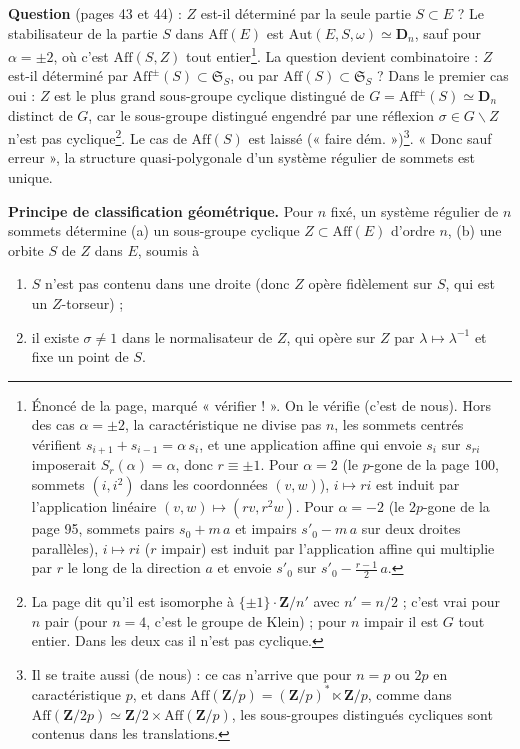 \documentclass[11pt,a4paper]{article}
\begin{document}
\textbf{Question} (pages 43 et 44) : $Z$ est-il déterminé par la seule partie
$S \subset E$ ? Le stabilisateur de la partie $S$ dans $\mathrm{Aff}(E)$ est
$\mathrm{Aut}(E, S, \omega) \simeq \mathbf{D}_n$, sauf pour $\alpha = \pm 2$,
où c'est $\mathrm{Aff}(S, Z)$ tout entier\footnote{Énoncé de la page,
marqué « vérifier ! ». On le vérifie (c'est de nous). Hors des cas $\alpha =
\pm 2$, la caractéristique ne divise pas $n$, les sommets centrés vérifient
$s_{i+1} + s_{i-1} = \alpha\, s_i$, et une application affine qui envoie
$s_i$ sur $s_{ri}$ imposerait $S_r(\alpha) = \alpha$, donc $r \equiv \pm 1$.
Pour $\alpha = 2$ (le $p$-gone de la page 100, sommets $(i, i^2)$ dans les
coordonnées $(v, w)$), $i \mapsto ri$ est induit par l'application linéaire
$(v, w) \mapsto (rv, r^2 w)$. Pour $\alpha = -2$ (le $2p$-gone de la
page 95, sommets pairs $s_0 + m\,a$ et impairs $s'_0 - m\,a$ sur deux droites
parallèles), $i \mapsto ri$ ($r$ impair) est induit par l'application affine
qui multiplie par $r$ le long de la direction $a$ et envoie $s'_0$ sur $s'_0 -
\frac{r-1}{2}\,a$.}. La question devient combinatoire : $Z$ est-il déterminé
par $\mathrm{Aff}^{\pm}(S) \subset \mathfrak{S}_S$, ou par $\mathrm{Aff}(S)
\subset \mathfrak{S}_S$ ? Dans le premier cas oui : $Z$ est le plus grand
sous-groupe cyclique distingué de $G = \mathrm{Aff}^{\pm}(S) \simeq
\mathbf{D}_n$ distinct de $G$, car le sous-groupe distingué engendré par une
réflexion $\sigma \in G \smallsetminus Z$ n'est pas cyclique\footnote{La page
dit qu'il est isomorphe à $\{\pm 1\} \cdot \mathbf{Z}/n'$ avec $n' = n/2$ ;
c'est vrai pour $n$ pair (pour $n = 4$, c'est le groupe de Klein) ; pour $n$
impair il est $G$ tout entier. Dans les deux cas il n'est pas cyclique.}. Le
cas de $\mathrm{Aff}(S)$ est laissé (« faire dém. »)\footnote{Il se traite
aussi (de nous) : ce cas n'arrive que pour $n = p$ ou $2p$ en caractéristique
$p$, et dans $\mathrm{Aff}(\mathbf{Z}/p) = (\mathbf{Z}/p)^{*} \ltimes
\mathbf{Z}/p$, comme dans $\mathrm{Aff}(\mathbf{Z}/2p) \simeq \mathbf{Z}/2
\times \mathrm{Aff}(\mathbf{Z}/p)$, les sous-groupes distingués cycliques sont
contenus dans les translations.}. « Donc sauf erreur », la structure
quasi-polygonale d'un système régulier de sommets est unique.

\textbf{Principe de classification géométrique.} Pour $n$ fixé, un système
régulier de $n$ sommets détermine (a) un sous-groupe cyclique $Z \subset
\mathrm{Aff}(E)$ d'ordre $n$, (b) une orbite $S$ de $Z$ dans $E$, soumis à
\begin{enumerate}
  \item[1)] $S$ n'est pas contenu dans une droite (donc $Z$ opère fidèlement
    sur $S$, qui est un $Z$-torseur) ;
  \item[2)] il existe $\sigma \neq 1$ dans le normalisateur de $Z$, qui opère
    sur $Z$ par $\lambda \mapsto \lambda^{-1}$ et fixe un point de $S$.
\end{enumerate}
\end{document}
